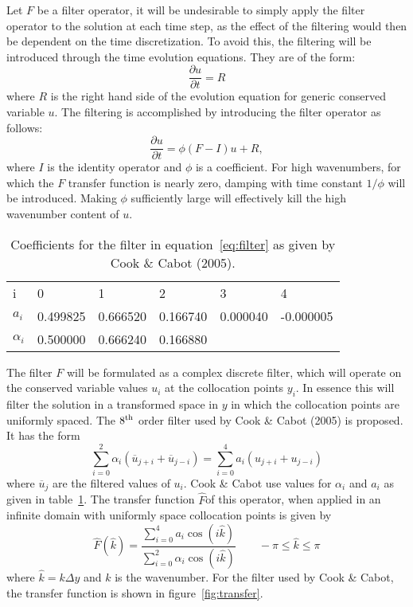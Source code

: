 Let $F$ be a filter operator, it will be undesirable to simply apply the
filter operator to the solution at each time step, as the effect of the
filtering would then be dependent on the time discretization. To avoid
this, the filtering will be introduced through the time evolution
equations. They are of the form:
\begin{equation}
\frac{\partial u}{\partial t} = R
\end{equation}
where $R$ is the right hand side of the evolution equation for generic
conserved variable $u$. The filtering is accomplished by introducing the
filter operator as follows:
\begin{equation}
\frac{\partial u}{\partial t} = \phi(F-I)u + R,
\label{eq:time_filter}
\end{equation}
where $I$ is the identity operator and $\phi$ is a coefficient. For high
wavenumbers, for which the $F$ transfer function is nearly zero, damping
with time constant $1/\phi$ will be introduced. Making $\phi$
sufficiently large will effectively kill the high wavenumber content of
$u$.

\begin{table}[t]
\begin{center}
\begin{tabular}{llllll}
i&0&1&2&3&4\\
$a_i$&0.499825&0.666520&0.166740&0.000040&-0.000005\\
$\alpha_i$&0.500000&0.666240&0.166880
\end{tabular}
\end{center}
\caption{Coefficients for the filter in equation~\ref{eq:filter} as
 given by Cook \& Cabot (2005).}
\label{tab:coefficients}
\end{table}

The filter $F$ will be formulated as a complex discrete filter, which
will operate on the conserved variable values $u_i$ at the collocation
points $y_i$. In essence this will filter the solution in a transformed
space in $y$ in which the collocation points are uniformly spaced. The
$8^{\rm th}$ order filter used by Cook \& Cabot (2005) is proposed. It
has the form
\begin{equation}
\sum_{i=0}^2 \alpha_i(\overline u_{j+i} + \overline u_{j-i}) = \sum_{i=0}^4
 a_i(u_{j+i}+u_{j-i})
\label{eq:filter}
\end{equation}
where $\overline u_j$ are the filtered values of $u_i$. Cook \& Cabot use
values for $\alpha_i$ and $a_i$ as given in table~\ref{tab:coefficients}. The transfer
function $\hat F$of this operator, when applied in an infinite domain with
uniformly space collocation points is given by
\begin{equation}
\hat F(\hat k)=\frac{\sum_{i=0}^4a_i\cos(i\hat
 k)}{\sum_{i=0}^2\alpha_i\cos(i\hat k)}\qquad -\pi\leq\hat k\leq\pi
\label{eq:transfer}
\end{equation}
where $\hat k=k\Delta y$ and $k$ is the wavenumber. For the filter used
by Cook \& Cabot, the transfer function is shown in figure~\ref{fig:transfer}.

